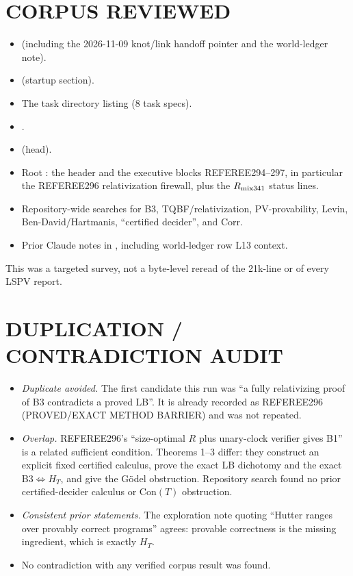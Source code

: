 \documentclass[11pt]{article}
\newcommand{\Corr}{\mathrm{Corr}}
\begin{document}
\section{CORPUS REVIEWED}
\begin{itemize}
\item {} (including the 2026-11-09 knot/link handoff pointer and the world-ledger note).
\item {} (startup section).
\item The task directory listing (8 task specs).
\item {}.
\item {} (head).
\item Root : the header and the executive blocks REFEREE294--297, in
particular the REFEREE296 relativization firewall, plus the $R_{\rm mix341}$ status lines.
\item Repository-wide searches for B3, TQBF/relativization, PV-provability, Levin,
Ben-David/Hartmanis, ``certified decider'', and $\Corr$.
\item Prior Claude notes in , including world-ledger row L13
context.
\end{itemize}
This was a targeted survey, not a byte-level reread of the 21k-line  or of
every LSPV report.

\section{DUPLICATION / CONTRADICTION AUDIT}
\begin{itemize}
\item \emph{Duplicate avoided.} The first candidate this run was ``a fully relativizing
proof of B3 contradicts a proved LB''. It is already recorded as REFEREE296 (PROVED/EXACT
METHOD BARRIER) and was not repeated.
\item \emph{Overlap.} REFEREE296's ``size-optimal $R$ plus unary-clock verifier gives B1''
is a related sufficient condition. Theorems 1--3 differ: they construct an explicit fixed
certified calculus, prove the exact LB dichotomy and the exact B3$\iff H_T$, and give the
G\"odel obstruction. Repository search found no prior certified-decider calculus or
Con$(T)$ obstruction.
\item \emph{Consistent prior statements.} The exploration note quoting ``Hutter ranges over
provably correct programs'' agrees: provable correctness is the missing ingredient, which is
exactly $H_T$.
\item No contradiction with any verified corpus result was found.
\end{itemize}
\end{document}
